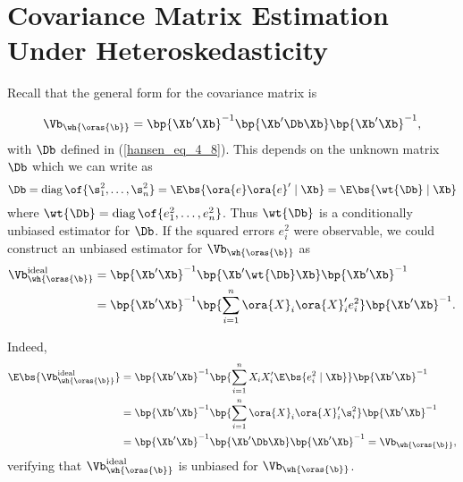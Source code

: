 
\section{Covariance Matrix Estimation Under Heteroskedasticity} \label{hansen_sec_4_15}

Recall that the general form for the covariance matrix is

$$\Vb_{\wh{\oras{\b}}} = \bp{\Xb^\prime \Xb}^{-1} \bp{\Xb^\prime \Db \Xb} \bp{\Xb^\prime \Xb}^{-1},$$
with $\Db$ defined in (\ref{hansen_eq_4_8}). This depends on the unknown matrix $\Db$ which we can write as 
\begin{equation}
    \notag
    \Db = \operatorname{diag}\of{\s_1^2, \ldots, \s_n^2} = \E\bs{\ora{e}\ora{e}^\prime \mid \Xb} = \E\bs{\wt{\Db} \mid \Xb}
\end{equation}
where $\wt{\Db} = \operatorname{diag}\of{e_1^2, \ldots, e_n^2}$. Thus $\wt{\Db}$ is a conditionally unbiased estimator for $\Db$. If the squared errors $e_i^2$ were observable, we could construct an unbiased estimator for $\Vb_{\wh{\oras{\b}}}$ as 
\begin{equation}
    \notag
    \begin{aligned}
        \Vb_{\wh{\oras{\b}}}^{\text{ideal}} & = \bp{\Xb^\prime \Xb}^{-1} \bp{\Xb^\prime \wt{\Db} \Xb} \bp{\Xb^\prime \Xb}^{-1} \\
        & = \bp{\Xb^\prime \Xb}^{-1} \bp{\sum_{i=1}^n \ora{X}_i \ora{X}_i^\prime e_i^2} \bp{\Xb^\prime \Xb}^{-1}.
    \end{aligned}
\end{equation}

Indeed, 
\begin{equation}
    \notag
    \begin{aligned}
        \E\bs{\Vb_{\wh{\oras{\b}}}^{\text{ideal}}} & = \bp{\Xb^\prime \Xb}^{-1} \bp{\sum_{i=1}^n X_i X_i^\prime \E\bs{e_i^2 \mid \Xb}} \bp{\Xb^\prime \Xb}^{-1} \\
        & = \bp{\Xb^\prime \Xb}^{-1} \bp{\sum_{i=1}^n \ora{X}_i \ora{X}_i^\prime \s_i^2} \bp{\Xb^\prime \Xb}^{-1} \\
        & = \bp{\Xb^\prime \Xb}^{-1} \bp{\Xb^\prime \Db \Xb} \bp{\Xb^\prime \Xb}^{-1} = \Vb_{\wh{\oras{\b}}},
    \end{aligned}
\end{equation}
verifying that $\Vb_{\wh{\oras{\b}}}^{\text{ideal}}$ is unbiased for $\Vb_{\wh{\oras{\b}}}$.

